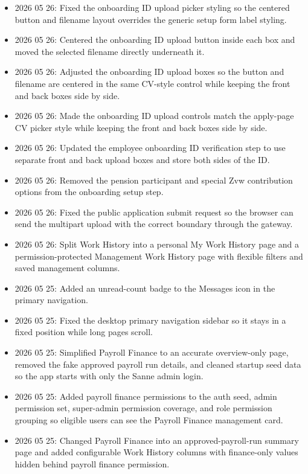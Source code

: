 \documentclass[11pt]{article}
\begin{document}
\begin{itemize}
    \item 2026 05 26: Fixed the onboarding ID upload picker styling so the centered button and filename layout overrides the generic setup form label styling.
    \item 2026 05 26: Centered the onboarding ID upload button inside each box and moved the selected filename directly underneath it.
    \item 2026 05 26: Adjusted the onboarding ID upload boxes so the button and filename are centered in the same CV-style control while keeping the front and back boxes side by side.
    \item 2026 05 26: Made the onboarding ID upload controls match the apply-page CV picker style while keeping the front and back boxes side by side.
    \item 2026 05 26: Updated the employee onboarding ID verification step to use separate front and back upload boxes and store both sides of the ID.
    \item 2026 05 26: Removed the pension participant and special Zvw contribution options from the onboarding setup step.
    \item 2026 05 26: Fixed the public application submit request so the browser can send the multipart upload with the correct boundary through the gateway.
    \item 2026 05 26: Split Work History into a personal My Work History page and a permission-protected Management Work History page with flexible filters and saved management columns.
    \item 2026 05 25: Added an unread-count badge to the Messages icon in the primary navigation.
    \item 2026 05 25: Fixed the desktop primary navigation sidebar so it stays in a fixed position while long pages scroll.
    \item 2026 05 25: Simplified Payroll Finance to an accurate overview-only page, removed the fake approved payroll run details, and cleaned startup seed data so the app starts with only the Sanne admin login.
    \item 2026 05 25: Added payroll finance permissions to the auth seed, admin permission set, super-admin permission coverage, and role permission grouping so eligible users can see the Payroll Finance management card.
    \item 2026 05 25: Changed Payroll Finance into an approved-payroll-run summary page and added configurable Work History columns with finance-only values hidden behind payroll finance permission.

\end{itemize}
\end{document}
